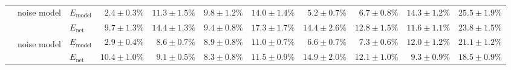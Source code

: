 \begin{sidewaystable}
\begin{tabular}{p{2.2cm} p{1.7cm} l r r r r r r r r }
	\\\cmidrule(l){2-11}
	&
	\multirow{2}{1.7cm}{\raggedleft %
	noise model} &
	$E_\mathrm{model}$ & 
	\color{Gray}$2.4 \pm 0.3\%$ & \color{Gray}$11.3 \pm 1.5\%$ & \color{Gray}$9.8 \pm 1.2\%$ & \color{Gray}$14.0 \pm 1.4\%$ & \color{Gray}$5.2 \pm 0.7\%$ & \color{Gray}$6.7 \pm 0.8\%$ & \color{Gray}$14.3 \pm 1.2\%$ & \color{Gray}$25.5 \pm 1.9\%$
	\\
	& & 
	$E_\mathrm{net}$ &
	\cellcolor{White!38!SteelBlue}$9.7 \pm 1.3\%$ & \cellcolor{White!19!SteelBlue}$14.4 \pm 1.3\%$ & \cellcolor{White!57!SteelBlue}$9.4 \pm 0.8\%$ & \cellcolor{White!13!SteelBlue}$17.3 \pm 1.7\%$ & \cellcolor{White!32!SteelBlue}$14.4 \pm 2.6\%$ & \cellcolor{White!13!SteelBlue}$12.8 \pm 1.5\%$ & \cellcolor{White!44!SteelBlue}$11.6 \pm 1.1\%$ & \cellcolor{White!13!SteelBlue}$23.8 \pm 1.5\%$
	\\\cmidrule(l){2-11}
	&
	\multirow{2}{1.7cm}{\raggedleft %
	noise model\textsuperscript{\dag}} &
	$E_\mathrm{model}$ & 
	\color{Gray}$2.9 \pm 0.4\%$ & \color{Gray}$8.6 \pm 0.7\%$ & \color{Gray}$8.9 \pm 0.8\%$ & \color{Gray}$11.0 \pm 0.7\%$ & \color{Gray}$6.6 \pm 0.7\%$ & \color{Gray}$7.3 \pm 0.6\%$ & \color{Gray}$12.0 \pm 1.2\%$ & \color{Gray}$21.1 \pm 1.2\%$
	\\
	& & 
	$E_\mathrm{net}$ &
	\cellcolor{White!13!SteelBlue}$10.4 \pm 1.0\%$ & \cellcolor{White!44!SteelBlue}$9.1 \pm 0.5\%$ & \cellcolor{White!63!SteelBlue}$8.3 \pm 0.8\%$ & \cellcolor{White!32!SteelBlue}$11.5 \pm 0.9\%$ & \cellcolor{White!19!SteelBlue}$14.9 \pm 2.0\%$ & \cellcolor{White!25!SteelBlue}$12.1 \pm 1.0\%$ & \cellcolor{White!57!SteelBlue}$9.3 \pm 0.9\%$ & \cellcolor{White!50!SteelBlue}$18.5 \pm 0.9\%$
	\\
	\bottomrule
	\end{tabular}
\end{sidewaystable}
